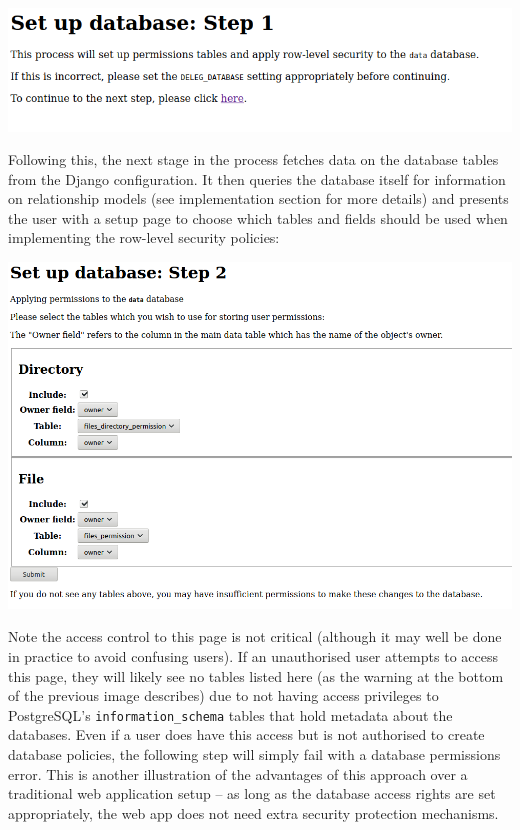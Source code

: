 \documentclass[12pt]{report}
\begin{document}
\begin{center}
  \includegraphics[scale=0.5]{02-setup1.png}
\end{center}

Following this, the next stage in the process fetches data on the database tables from the Django configuration. It then queries the database itself for information on relationship models (see implementation section for more details) and presents the user with a setup page to choose which tables and fields should be used when implementing the row-level security policies:

\begin{center}
  \includegraphics[width=\textwidth]{03-setup2.png}
\end{center}

Note the access control to this page is not critical (although it may well be done in practice to avoid confusing users). If an unauthorised user attempts to access this page, they will likely see no tables listed here (as the warning at the bottom of the previous image describes) due to not having access privileges to PostgreSQL's \verb+information_schema+ tables that hold metadata about the databases. Even if a user does have this access but is not authorised to create database policies, the following step will simply fail with a database permissions error. This is another illustration of the advantages of this approach over a traditional web application setup -- as long as the database access rights are set appropriately, the web app does not need extra security protection mechanisms.
\end{document}
